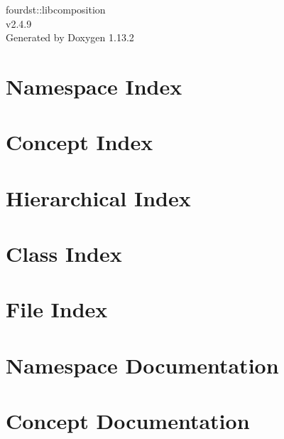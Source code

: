 \documentclass[twoside]{book}
\newcommand{\+}{\discretionary{\mbox{\scriptsize$\hookleftarrow$}}{}{}}
\newcommand{\clearemptydoublepage}{%
    \newpage{\pagestyle{empty}\cleardoublepage}%
  }
\begin{document}
  \raggedbottom
    \hypersetup{pageanchor=false,
                bookmarksnumbered=true,
                pdfencoding=unicode
               }
  \begin{titlepage}
  \vspace*{7cm}
  \begin{center}%
  {\Large fourdst\+::libcomposition}\\
  [1ex]\large v2.\+4.\+9 \\
  \vspace*{1cm}
  {\large Generated by Doxygen 1.13.2}\\
  \end{center}
  \end{titlepage}
  \clearemptydoublepage
  \tableofcontents
  \clearemptydoublepage
  \hypersetup{pageanchor=true}

\chapter{Namespace Index}

\chapter{Concept Index}

\chapter{Hierarchical Index}

\chapter{Class Index}

\chapter{File Index}

\chapter{Namespace Documentation}







\chapter{Concept Documentation}

\end{document}
